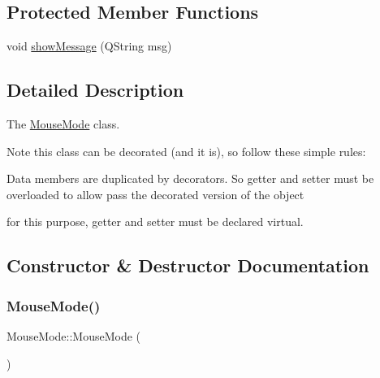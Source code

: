 \subsection*{Protected Member Functions}
\begin{DoxyCompactItemize}
\item 
void \mbox{\hyperlink{class_mouse_mode_a7c9976cfe349be0d09131faf6dcfa039}{show\+Message}} (Q\+String msg)
\end{DoxyCompactItemize}


\subsection{Detailed Description}
The \mbox{\hyperlink{class_mouse_mode}{Mouse\+Mode}} class. 

\begin{DoxyNote}{Note}
this class can be decorated (and it is), so follow these simple rules\+:
\begin{DoxyItemize}
\item Data members are duplicated by decorators. So getter and setter must be overloaded to allow pass the decorated version of the object
\item for this purpose, getter and setter must be declared virtual. 
\end{DoxyItemize}
\end{DoxyNote}


\subsection{Constructor \& Destructor Documentation}
\mbox{\label{class_mouse_mode_aae493d25aba2bef7e671bda4b1a0634e}} 
\subsubsection{\texorpdfstring{MouseMode()}{MouseMode()}}
{\footnotesize\ttfamily Mouse\+Mode\+::\+Mouse\+Mode (\begin{DoxyParamCaption}{ }\end{DoxyParamCaption})}

\mbox{\label{class_mouse_mode_a51be94cbe5d7f10debd220ca060eb1c5}} 
